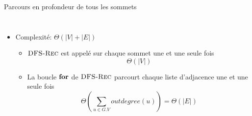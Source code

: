 \begin{frame}{Parcours en profondeur de tous les sommets}

\begin{columns}
\begin{column}{5cm}
\begin{center}
{\small
{}
}
\end{center}
\end{column}
\begin{column}{5cm}
\begin{center}
{\small
{}
}
\end{center}
\end{column}
\end{columns}

\bigskip

\begin{itemize}
\item Complexité: $\Theta(|V|+|E|)$
\begin{itemize}
\item $\textnormal{\scshape DFS-Rec}$ est appelé sur chaque sommet une et une seule fois
$$\Theta(|V|)$$
\item La boucle $\textbf{for}$ de $\textnormal{\scshape DFS-Rec}$ parcourt chaque liste
  d'adjacence une et une seule fois $$\Theta(\sum_{u\in G.V} outdegree(u))=\Theta(|E|)$$
\end{itemize}
\end{itemize}


\end{frame}

